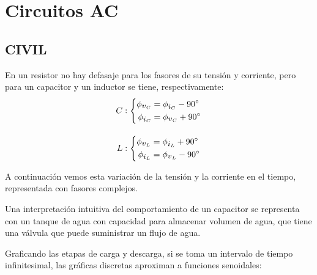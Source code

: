 \chapter{Circuitos AC}

\section{CIVIL}

En un resistor no hay defasaje para los fasores de su tensión y corriente, pero para un capacitor y un inductor se tiene, respectivamente:
\begin{gather*}
    C: \left\{
    \begin{aligned}
        \phi_{\voltage_C} &= \phi_{\current_C} - \ang{90}
        \\
        \phi_{\current_C} &= \phi_{\voltage_C} + \ang{90}
    \end{aligned}
    \right.
    \\[1em]
    L: \left\{
    \begin{aligned}
        \phi_{\voltage_L} &= \phi_{\current_L} + \ang{90}
        \\
        \phi_{\current_L} &= \phi_{\voltage_L} - \ang{90}
    \end{aligned}
    \right.
\end{gather*}

A continuación vemos esta variación de la tensión y la corriente en el tiempo, representada con fasores complejos.

\begin{center}
    \def\svgwidth{0.6\linewidth}
    
\end{center}

Una interpretación intuitiva del comportamiento de un capacitor se representa con un tanque de agua con capacidad para almacenar volumen de agua, que tiene una válvula que puede suministrar un flujo de agua.

\begin{center}
    \def\svgwidth{0.9\linewidth}
    
\end{center}

Graficando las etapas de carga y descarga, si se toma un intervalo de tiempo infinitesimal, las gráficas discretas aproximan a funciones senoidales:

\begin{center}
    \def\svgwidth{0.8\linewidth}
    
\end{center}

